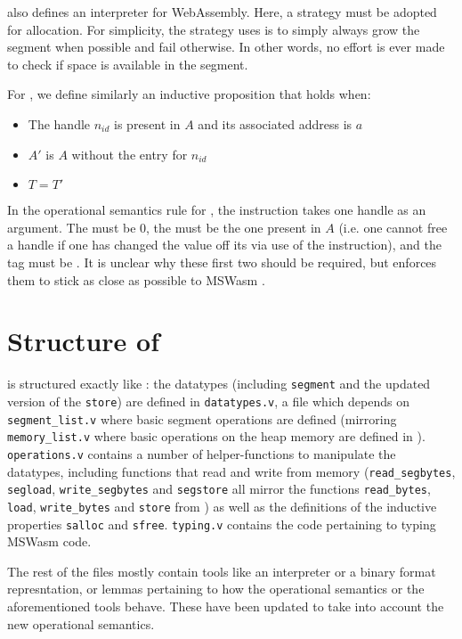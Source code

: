 \documentclass[a4paper]{article}
\begin{document}
\iriswasm also defines an interpreter for WebAssembly. Here, a strategy must be adopted for allocation. For simplicity, the strategy \irismswasm uses is to simply always grow the segment when possible and fail otherwise. In other words, no effort is ever made to check if space is available in the segment.

For , we define similarly an inductive proposition that holds when:
\begin{itemize}
\item The handle \xxWid \( n_{id} \) is present in \( A \) and its associated address is \( a \)
\item \( A' \) is \( A \) without the entry for \( n_{id} \)
\item \( T = T' \)
\end{itemize}
In the operational semantics rule for \xxWsegfree, the instruction takes one handle as an argument. The \xxWoffset must be 0, the \xxWbase must be the one present in \( A \) (i.e. one cannot free a handle if one has changed the value off its \xxWbase via use of the \xxWslice instruction), and the \xxWvalid tag must be \xxCtrue. It is unclear why these first two should be required, but \irismswasm enforces them to stick as close as possible to MSWasm \cite{mswasm}.





\section{Structure of \irismswasm}

\irismswasm is structured exactly like \iriswasm: the datatypes (including {\tt segment} and the updated version of the {\tt store}) are defined in {\tt datatypes.v}, a file which depends on {\tt segment\_list.v} where basic segment operations are defined (mirroring {\tt memory\_list.v} where basic operations on the heap memory are defined in \iriswasm). {\tt operations.v} contains a number of helper-functions to manipulate the datatypes, including functions that read and write from memory ({\tt read\_segbytes}, {\tt segload}, {\tt write\_segbytes} and {\tt segstore} all mirror the functions {\tt read\_bytes}, {\tt load}, {\tt write\_bytes} and {\tt store} from \iriswasm) as well as the definitions of the inductive properties {\tt salloc} and {\tt sfree}. {\tt typing.v} contains the code pertaining to typing MSWasm code.

The rest of the files mostly contain tools like an interpreter or a binary format represntation, or lemmas pertaining to how the operational semantics or the aforementioned tools behave. These have been updated to take into account the new operational semantics.
\end{document}
